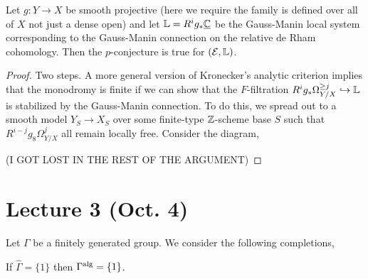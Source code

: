 \documentclass[12pt]{article}
\begin{document}
\begin{theorem}[Katz]
Let $g : Y \to X$ be smooth projective (here we require the family is defined over all of $X$ not just a dense open) and let $\mathbb{L} = R^i g_* \underline{\mathbb{C}}$ be the Gauss-Manin local system corresponding to the Gauss-Manin connection on the relative de Rham cohomology. Then the $p$-conjecture is true for $(\mathcal{E}, \mathbb{L})$. 
\end{theorem}

\begin{proof}
Two steps. A more general version of Kronecker's analytic criterion implies that the monodromy is finite if we can show that the $F$-filtration $R^i g_* \Omega^{\ge j}_{Y/X} \hookrightarrow \mathbb{L}$ is stabilized by the Gauss-Manin connection. To do this, we spread out to a smooth model $Y_S \to X_S$ over some finite-type $\mathbb{Z}$-scheme base $S$ such that $R^{i-j} g_8 \Omega^j_{Y/X}$ all remain locally free. Consider the diagram,
\begin{center}
\end{center}
(I GOT LOST IN THE REST OF THE ARGUMENT)
\end{proof}

\section{Lecture 3 (Oct. 4)}


Let $\Gamma$ be a finitely generated group. We consider the following completions,
\begin{center}
\end{center}

\begin{theorem}[Mal\v{c}ev, 1940]
If $\widehat{\Gamma} = \{ 1 \}$ then $\Gamma^{\mathrm{alg}} = \{ 1 \}$.
\end{theorem}
\end{document}
